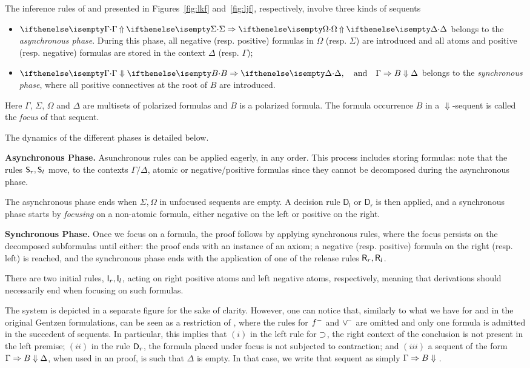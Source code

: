 \documentclass{llncs}
\begin{document}
The inference rules of \LKF and \LJF presented in Figures~\ref{fig:lkf} and~\ref{fig:ljf}, respectively, involve three kinds of sequents 
\begin{itemize}
\item $\jUnf{\Gamma}{\Sigma}{\Omega}{\Delta}$ belongs to the {\em asynchronous phase}. During this phase, all negative (resp. positive) formulas in  $\Omega$ (resp. $\Sigma$) are introduced and all atoms and positive (resp. negative) formulas  are stored in the context $\Delta$ (resp. $\Gamma$);
\item $\jLf{\Gamma}{B}{\Delta},\quad\hbox{and}\quad
  \jRf{\Gamma}{B}{\Delta}$ belongs to the {\em synchronous phase}, where all positive connectives at the root of $B$ are introduced. 
\end{itemize}
Here $\Gamma$, $\Sigma$, $\Omega$ and $\Delta$ are
multisets of polarized formulas and $B$ is a polarized formula.
%
The formula occurrence $B$ in a $\Downarrow$-sequent is called the
\emph{focus} of that sequent.

The dynamics of the different phases is detailed below.

\noindent
{\bf Asynchronous Phase.} Asunchronous rules can be applied eagerly, in any order.
This process includes storing formulas: note that the rules $\mathsf{S}_r, \mathsf{S}_l$ move, to the 
contexts $\Gamma/\Delta$, atomic or negative/positive formulas since they cannot be decomposed during the asynchronous phase.

The asynchronous phase ends when $\Sigma,\Omega$ in unfocused sequents are empty. A decision rule $\mathsf{D_l}$ or  $\mathsf{D_r}$ is then applied,  and
a synchronous phase starts by {\em focusing} on a non-atomic formula, either negative on the left or positive on the right.

\noindent
{\bf Synchronous Phase.} Once we focus on a formula, the proof  follows by applying synchronous rules, where  the focus persists on the decomposed subformulas until either: the proof ends with an instance of an axiom;
a negative (resp. positive) formula  on the right (resp. left) is reached, and the synchronous phase  ends with the application of one of the release rules $\mathsf{R}_r,\mathsf{R}_l$.


There are two initial rules, $\mathsf{I}_r,\mathsf{I}_l$, acting on right positive atoms and left negative atoms, respectively, meaning that derivations should necessarily end when focusing on such formulas.


The system  \LJF is depicted in a separate figure for the sake of clarity.
%
However, one can notice that, similarly to what we have for \LJ and
\LK in the original Gentzen formulations, \LJF can be seen as a
restriction of \LKF, where the rules for $f^-$ and $\vee^{\!-}$ are
omitted and only one formula is admitted in the succedent of sequents.  In
particular, this implies that $(i)$ in the left rule for $\supset$, the
right context of the conclusion is not present in the left premise;
$(ii)$ in the rule $\mathsf{D}_r$, the formula placed under focus is
not subjected to contraction; and $(iii)$ a sequent of the form $\Gamma \Rightarrow B \Downarrow{\Delta}$, when used in an
\LJF proof, is such that $\Delta$ is empty.
%
In that case, we write that sequent as simply $\Gamma \Rightarrow B \Downarrow{}$.
\end{document}
